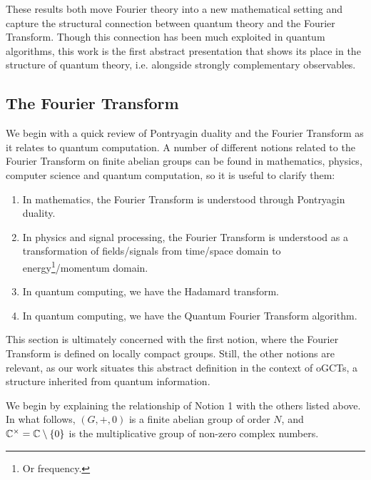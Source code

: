 
These results both move Fourier theory into a new mathematical setting and capture the structural connection between quantum theory and the Fourier Transform.  Though this connection has been much exploited in quantum algorithms, this work is the first abstract presentation that shows its place in the structure of quantum theory, i.e. alongside strongly complementary observables.

\subsection{The Fourier Transform}
\label{sec:FT}
We begin with a quick review of Pontryagin duality and the Fourier Transform as it relates to quantum computation. A number of different notions related to the Fourier Transform on finite abelian groups can be found in mathematics, physics, computer science and quantum computation, so it is useful to clarify them:

\begin{enumerate}
  \item[1.] In mathematics, the Fourier Transform is understood through Pontryagin duality.
  \item[2.] In physics and signal processing, the Fourier Transform is understood as a transformation of fields/signals from time/space domain to energy\footnote{Or frequency.}/momentum domain.
  \item[3.] In quantum computing, we have the Hadamard transform.
  \item[4.] In quantum computing, we have the Quantum Fourier Transform algorithm.
\end{enumerate}

This section is ultimately concerned with the first notion, where the Fourier Transform is defined on locally compact groups. Still, the other notions are relevant, as our work situates this abstract definition in the context of oGCTs, a structure inherited from quantum information. 

We begin by explaining the relationship of Notion 1 with the others listed above. In what follows, $(G,+,0)$ is a finite abelian group of order $N$, and $\mathbb{C}^{\times}=\mathbb{C}\setminus\{0\}$ is the multiplicative group of non-zero complex numbers.

